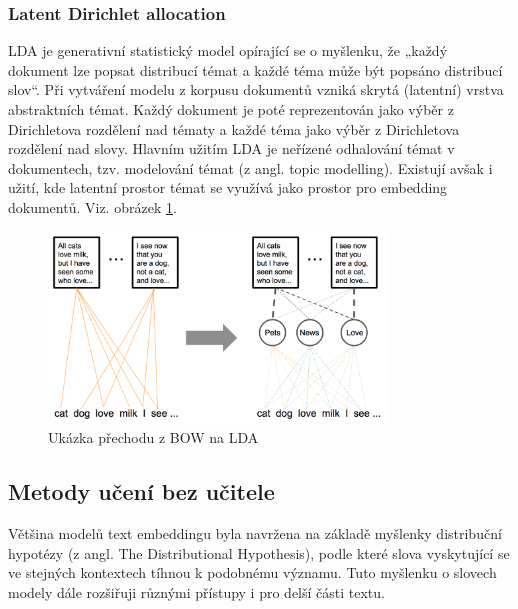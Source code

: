 \documentclass[thesis=M,czech]{FITthesis}[2019/12/23]
\begin{document}
\subsubsection{Latent Dirichlet allocation}
LDA je generativní statistický model opírající se o myšlenku, že „každý dokument lze popsat distribucí témat a každé téma může být popsáno distribucí slov“. Při vytváření modelu z korpusu dokumentů vzniká skrytá (latentní) vrstva abstraktních témat. Každý dokument je poté reprezentován jako výběr z Dirichletova rozdělení nad tématy a každé téma jako výběr z Dirichletova rozdělení nad slovy. Hlavním užitím LDA je neřízené odhalování témat v dokumentech, tzv. modelování témat (z angl. topic modelling). Existují avšak i užití, kde latentní prostor témat se využívá jako prostor pro embedding dokumentů. Viz. obrázek \ref{fig:palachy2019LDA}.
\begin{figure}\centering
	\includegraphics[width=0.8\textwidth]{images/palachy2019/palachy2019_LDA.png}
	\caption{Ukázka přechodu z BOW na LDA\cite{palachy2019}}\label{fig:palachy2019LDA}
\end{figure}

\subsection{Metody učení bez učitele}
Většina modelů text embeddingu byla navržena na základě myšlenky distribuční hypotézy (z angl. The Distributional Hypothesis), podle které slova vyskytující se ve stejných kontextech tíhnou k podobnému významu. Tuto myšlenku o slovech modely dále rozšiřuji různými přístupy i pro delší části textu.
\end{document}
